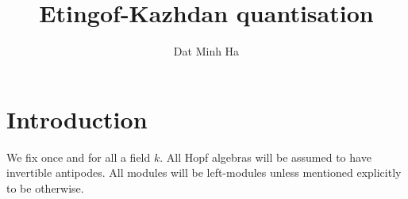 

\setcounter{section}{-1}





    \title{Etingof-Kazhdan quantisation}
    
    \author{Dat Minh Ha}
    \maketitle
    
    \begin{abstract}
    
    \end{abstract}
    
    {
    \hypersetup{} 
    \tableofcontents %
    }

    \section{Introduction}
        \begin{convention}
            We fix once and for all a field $k$. All Hopf algebras will be assumed to have invertible antipodes. All modules will be left-modules unless mentioned explicitly to be otherwise.
        \end{convention}

    
    
    

    

    

    \begin{appendices}
        
    \end{appendices}
    
    \printbibliography

